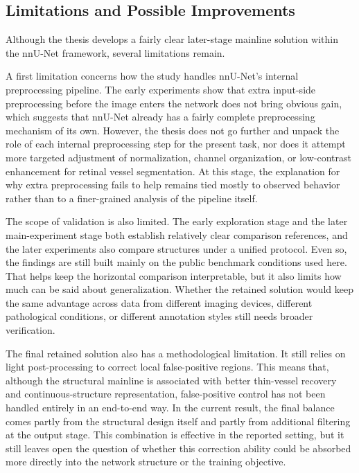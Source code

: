 \documentclass[a4paper,11pt]{article}
\begin{document}
\subsection{Limitations and Possible Improvements}
Although the thesis develops a fairly clear later-stage mainline solution within the nnU-Net framework, several limitations remain.

A first limitation concerns how the study handles nnU-Net's internal preprocessing pipeline. The early experiments show that extra input-side preprocessing before the image enters the network does not bring obvious gain, which suggests that nnU-Net already has a fairly complete preprocessing mechanism of its own. However, the thesis does not go further and unpack the role of each internal preprocessing step for the present task, nor does it attempt more targeted adjustment of normalization, channel organization, or low-contrast enhancement for retinal vessel segmentation. At this stage, the explanation for why extra preprocessing fails to help remains tied mostly to observed behavior rather than to a finer-grained analysis of the pipeline itself.

The scope of validation is also limited. The early exploration stage and the later main-experiment stage both establish relatively clear comparison references, and the later experiments also compare structures under a unified protocol. Even so, the findings are still built mainly on the public benchmark conditions used here. That helps keep the horizontal comparison interpretable, but it also limits how much can be said about generalization. Whether the retained solution would keep the same advantage across data from different imaging devices, different pathological conditions, or different annotation styles still needs broader verification.

The final retained solution also has a methodological limitation. It still relies on light post-processing to correct local false-positive regions. This means that, although the structural mainline is associated with better thin-vessel recovery and continuous-structure representation, false-positive control has not been handled entirely in an end-to-end way. In the current result, the final balance comes partly from the structural design itself and partly from additional filtering at the output stage. This combination is effective in the reported setting, but it still leaves open the question of whether this correction ability could be absorbed more directly into the network structure or the training objective.
\end{document}
